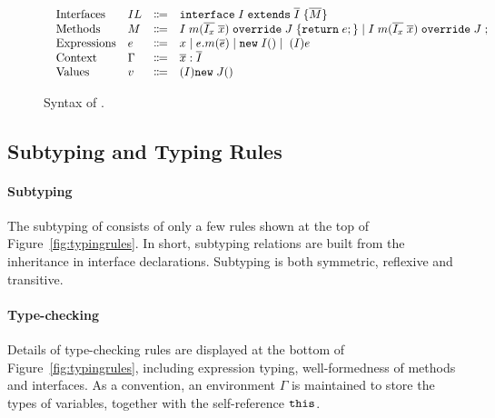 \begin{figure*}[t]
\saveSpaceFig
\begin{displaymath}
\begin{array}{l}
\begin{array}{llrl}
\text{Interfaces}   & IL & \Coloneqq & \texttt{interface} \; I \; \texttt{extends} \; \overline{I} \; {\{} \overline{M} {\}} \\
\text{Methods}      & M  & \Coloneqq & I \; m (\overline{I_x} \; \overline{x}) \; \texttt{override} \; J \; {\{} \texttt{return} \; e ; {\}}  \mid
									   I \; m (\overline{I_x} \; \overline{x}) \; \texttt{override} \; J \; ; \\
\text{Expressions}  & e  & \Coloneqq & x \mid
e.m(\overline{e}) \mid
\texttt{new} \; I() \mid \; (I)e \\
\text{Context}      & \Gamma & \Coloneqq & \overline{x}:\overline{I} \\
\text{Values}       & v & \Coloneqq & (I) \texttt{new} \; J() \\
\end{array}
\end{array}
\end{displaymath}
\caption{Syntax of \name{}.}\label{fig:syntax}
\saveSpaceFig
\end{figure*}

\subsection{Subtyping and Typing Rules}
\paragraph{Subtyping}
The subtyping of \MIM{} consists of only a few rules shown at the top of Figure~\ref{fig:typingrules}.
In short, subtyping relations are built from the inheritance in interface
declarations. Subtyping is both symmetric, reflexive and transitive.

\paragraph{Type-checking}
Details of type-checking rules are displayed at the bottom of Figure~\ref{fig:typingrules}, including expression
typing, well-formedness of methods and interfaces. As a convention, an environment
$\Gamma$ is maintained to store the types of variables, together with
the self-reference $\texttt{this}$.

